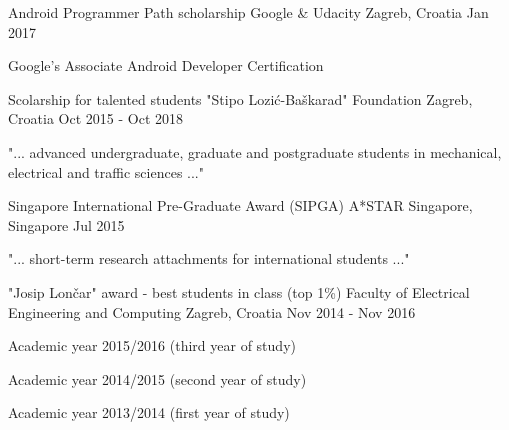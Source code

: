 
\begin{cventries}

  \cventry
    {Android Programmer Path scholarship} %
    {Google \& Udacity} %
    {Zagreb, Croatia} %
    {Jan 2017} %
    {
      \begin{cvitems} %
        \item {Google’s Associate Android Developer Certification}
      \end{cvitems}
    }

  \cventry
    {Scolarship for talented students} %
    {"Stipo Lozić-Baškarad" Foundation} %
    {Zagreb, Croatia} %
    {Oct 2015 - Oct 2018} %
    {
      \begin{cvitems}
        \item {"... advanced undergraduate, graduate and postgraduate students in mechanical, electrical and traffic sciences ..."}
      \end{cvitems}
    }

  \cventry
    {Singapore International Pre-Graduate Award (SIPGA)} %
    {A*STAR} %
    {Singapore, Singapore} %
    {Jul 2015} %
    {
      \begin{cvitems} %
        \item {"​... short-term research attachments for international students ..."​}
      \end{cvitems}
    }

  \cventry
  {"Josip Lončar"​ award - best students in class (top 1\%)} %
  {Faculty of Electrical Engineering and Computing} %
  {Zagreb, Croatia} %
  {Nov 2014 - Nov 2016} %
  {
    \begin{cvitems} %
      \item {Academic year 2015/2016 (third year of study)}
      \item {Academic year 2014/2015 (second year of study)}
      \item {Academic year 2013/2014 (first year of study)}
    \end{cvitems}
  }


\end{cventries}
